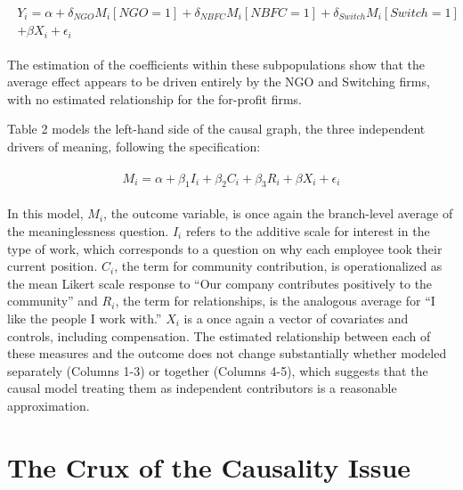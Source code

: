 \documentclass[12pt]{article}
\begin{document}
\begin{align} 
\begin{split}
Y_i = \alpha + \delta_{NGO} M_i  [NGO=1]+ \delta_{NBFC} M_i  [NBFC=1] + \delta_{Switch} M_i  [Switch=1] \\
 +  \beta X_i + \epsilon_i
\end{split}					
\end{align}

The estimation of the coefficients within these subpopulations show that the average effect appears to be driven entirely by the NGO and Switching firms, with no estimated relationship for the for-profit firms. 

Table 2 models the left-hand side of the causal graph, the three independent drivers of meaning, following the specification:

\begin{align} 
\begin{split}
M_i = \alpha + \beta_1 I_i +  \beta_2 C_i  +  \beta_3 R_i +  \beta X_i + \epsilon_i
\end{split}					
\end{align}

In this model, $M_i$, the outcome variable, is once again the branch-level average of the meaninglessness question. $I_i$ refers to the additive scale for interest in the type of work, which corresponds to a question on why each employee took their current position. $C_i$, the term for community contribution, is operationalized as the mean Likert scale response to ``Our company contributes positively to the community'' and $R_i$, the term for relationships, is the analogous average for ``I like the people I work with.'' $X_i$ is a once again a vector of covariates and controls, including compensation. The estimated relationship between each of these measures and the outcome does not change substantially whether modeled separately (Columns 1-3) or together (Columns 4-5), which suggests that the causal model treating them as independent contributors is a reasonable approximation.

\section{The Crux of the Causality Issue}
\end{document}
